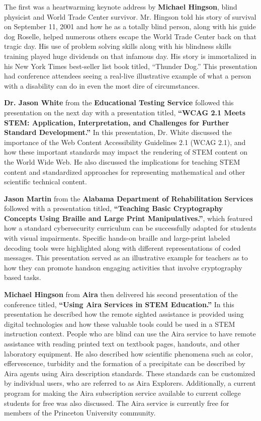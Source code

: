 \documentclass[11.5pt]{sig-alternate} %
\begin{document}
\pagebreak
\clearpage
\begin{large}

The first was a heartwarming keynote address by \textbf{Michael Hingson}, blind physicist and World Trade Center survivor. Mr. Hingson told his story of survival on September 11, 2001 and how he as a totally blind person, along with his guide dog Roselle, helped numerous others escape the World Trade Center back on that tragic day. His use of problem solving skills along with his blindness skills training played huge dividends on that infamous day. His story is immortalized in his New York Times best-seller list book titled, “Thunder Dog.” This presentation had conference attendees seeing a real-live illustrative example of what a person with a disability can do in even the most dire of circumstances.

\textbf{Dr. Jason White} from the \textbf{Educational Testing Service} followed this presentation on the next day with a presentation titled, \textbf{“WCAG 2.1 Meets STEM: Application, Interpretation, and Challenges for Further Standard Development.”} In this presentation, Dr. White discussed the importance of the Web Content Accessibility Guidelines 2.1 (WCAG 2.1), and how these important standards may impact the rendering of STEM content on the World Wide Web. He also discussed the implications for teaching STEM content and standardized approaches for representing mathematical and other scientific technical content.

\textbf{Jason Martin} from the \textbf{Alabama Department of Rehabilitation Services} followed with a presentation titled, \textbf{“Teaching Basic Cryptography Concepts Using Braille and Large Print Manipulatives.”}, which featured how a standard cybersecurity curriculum can be successfully adapted for students with visual impairments. Specific hands-on braille and large-print labeled decoding tools were highlighted along with different representations of coded messages. This presentation served as an illustrative example for teachers as to how they can promote handson engaging activities that involve cryptography based tasks.

\textbf{Michael Hingson} from \textbf{Aira} then delivered his second presentation of the conference titled, \textbf{“Using Aira Services in STEM Education.”} In this presentation he described how the remote sighted assistance is provided using digital technologies and how these valuable tools could be used in a STEM instruction context. People who are blind can use the Aira service to have remote assistance with reading printed text on textbook pages, handouts, and other laboratory equipment. He also described how scientific phenomena such as color, effervescence, turbidity and the formation of a precipitate can be described by Aira agents using Aira description standards. These standards can be customized by individual users, who are referred to as Aira Explorers. Additionally, a current program for making the Aira subscription service available to current college students for free was also discussed.  The Aira service is currently free for members of the Princeton University community.


\end{large}
\end{document}
